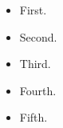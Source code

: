 \documentclass{beamer}
\begin{document}
\begin{frame}
\hyperlink{label}{}
\end{frame}

\begin{frame}
\begin{itemize}[<+->]
\item First.
\item Second.
\item Third.
\item Fourth.\hypertarget<4>{label}{}
\item Fifth.
\end{itemize}
\end{frame}
\end{document}
